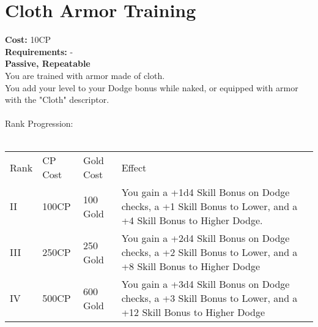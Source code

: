 \section{Cloth Armor Training}\label{perk:clothArmorTraining}
\textbf{Cost:} 10CP\\
\textbf{Requirements:} -\\
\textbf{Passive, Repeatable}\\
You are trained with armor made of cloth.\\
You add your level to your Dodge bonus while naked, or equipped with armor with the "Cloth" descriptor.\\
\\

Rank Progression:\\
\\
\begin{longtable}{l | l | l | p{9cm}}
	Rank & CP Cost & Gold Cost & Effect\\
	II & 100CP & 100 Gold & You gain a +1d4 Skill Bonus on Dodge checks, a +1 Skill Bonus to Lower, and a +4 Skill Bonus to Higher Dodge.\\
	III & 250CP & 250 Gold & You gain a +2d4 Skill Bonus on Dodge checks, a +2 Skill Bonus to Lower, and a +8 Skill Bonus to Higher Dodge\\
	IV & 500CP & 600 Gold & You gain a +3d4 Skill Bonus on Dodge checks, a +3 Skill Bonus to Lower, and a +12 Skill Bonus to Higher Dodge\\
\end{longtable}